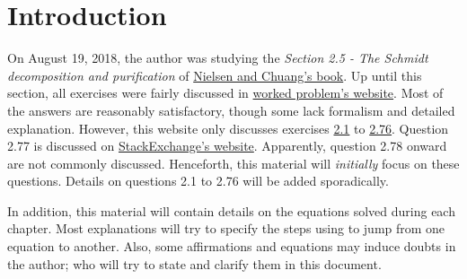 \section{Introduction}

On August 19, 2018, the author was studying the \emph{Section 2.5 - The Schmidt decomposition and purification} of \href{https://www.cambridge.org/core/books/quantum-computation-and-quantum-information/01E10196D0A682A6AEFFEA52D53BE9AE}{Nielsen and Chuang's book}. Up until this section, all exercises were fairly discussed in \href{https://workedproblems.wordpress.com/2010/06/06/nielsen-and-chuang-exercise-2-76/}{worked problem's website}. Most of the answers are reasonably satisfactory, though some lack formalism and detailed explanation. However, this website only discusses exercises \href{https://workedproblems.wordpress.com/2010/02/22/exercise-2-1/}{2.1} to \href{https://workedproblems.wordpress.com/2010/06/06/nielsen-and-chuang-exercise-2-76/}{2.76}. Question 2.77 is discussed on \href{https://physics.stackexchange.com/questions/183000/why-schmidt-decomposition-only-holds-for-two-component-composite-systems}{StackExchange's website}. Apparently, question 2.78 onward are not commonly discussed. Henceforth, this material will \emph{initially} focus on these questions. Details on questions 2.1 to 2.76 will be added sporadically.

In addition, this material will contain details on the equations solved during each chapter. Most explanations will try to specify the steps using to jump from one equation to another. Also, some affirmations and equations may induce doubts in the author; who will try to state and clarify them in this document.

\pagebreak